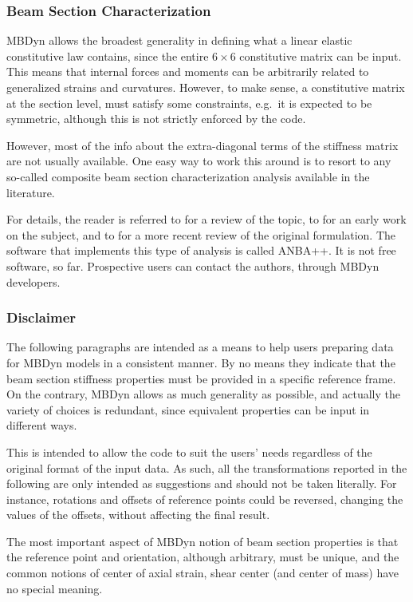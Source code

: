 \subsubsection{Beam Section Characterization}
MBDyn allows the broadest generality in defining what a linear elastic 
constitutive law contains, since the entire $6\times{6}$ constitutive
matrix can be input.
This means that internal forces and moments can be arbitrarily related
to generalized strains and curvatures.
However, to make sense, a constitutive matrix at the section level,
must satisfy some constraints, e.g.\ it is expected to be symmetric, 
although this is not strictly enforced by the code.

However, most of the info about the extra-diagonal terms 
of the stiffness matrix are not usually available.
One easy way to work this around is to resort to any so-called
composite beam section characterization analysis available 
in the literature.

For details, the reader is referred to \cite{HODGES-REVIEW90} 
for a review of the topic, to \cite{ANBA-GIAVOTTO-83}
for an early work on the subject, and to \cite{MASARATI-2001}
for a more recent review of the original formulation.
The software that implements this type of analysis is called ANBA++.
It is not free software, so far.
Prospective users can contact the authors, through MBDyn developers.


\subsubsection{Disclaimer}
The following paragraphs are intended as a means to help users
preparing data for MBDyn models in a consistent manner.
By no means they indicate that the beam section stiffness properties
must be provided in a specific reference frame.
On the contrary, MBDyn allows as much generality as possible,
and actually the variety of choices is redundant, since equivalent
properties can be input in different ways.

This is intended to allow the code to suit the users' needs
regardless of the original format of the input data.
As such, all the transformations reported in the following 
are only intended as suggestions and should not be taken literally.
For instance, rotations and offsets of reference points
could be reversed, changing the values of the offsets, without
affecting the final result.

The most important aspect of MBDyn notion of beam section properties
is that the reference point and orientation, although arbitrary,
must be unique, and the common notions of center of axial strain,
shear center (and center of mass) have no special meaning.



